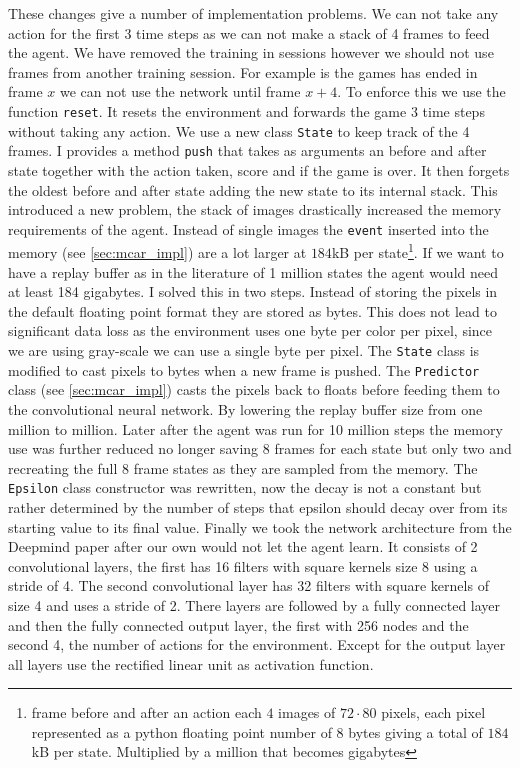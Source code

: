 These changes give a number of implementation problems. We can not take any action for the first 3 time steps as we can not make a stack of 4 frames to feed the agent. We have removed the training in sessions however we should not use frames from another training session. For example is the games has ended in frame $x$ we can not use the network until frame $x+4$. To enforce this we use the function \texttt{reset}. It resets the environment and forwards the game 3 time steps without taking any action. We use a new class \texttt{State} to keep track of the 4 frames. I provides a method \texttt{push} that takes as arguments an before and after state together with the action taken, score and if the game is over. It then forgets the oldest before and after state adding the new state to its internal stack.
%
This introduced a new problem, the stack of images drastically increased the memory requirements of the agent. Instead of single images the \texttt{event} inserted into the memory (see \autoref{sec:mcar_impl}) are a lot larger at $184$kB per state\footnote{frame before and after an action each $4$ images of $72\cdot80$ pixels, each pixel represented as a python floating point number of $8$ bytes giving a total of $184$kB per state. Multiplied by a million that becomes gigabytes}. If we want to have a replay buffer as in the literature\cite{DQN} of 1 million states the agent would need at least 184 gigabytes. I solved this in two steps. Instead of storing the pixels in the default floating point format they are stored as bytes. This does not lead to significant data loss as the environment uses one byte per color per pixel, since we are using gray-scale we can use a single byte per pixel. The \texttt{State} class is modified to cast pixels to bytes when a new frame is pushed. The \texttt{Predictor} class (see \autoref{sec:mcar_impl}) casts the pixels back to floats before feeding them to the convolutional neural network. By lowering the replay buffer size from one million to  million. Later after the agent was run for 10 million steps the memory use was further reduced no longer saving 8 frames for each state but only two and recreating the full 8 frame states as they are sampled from the memory.
%
The \texttt{Epsilon} class constructor was rewritten, now the decay is not a constant but rather determined by the number of steps that epsilon should decay over from its starting value to its final value.
%
Finally we took the network architecture from the Deepmind paper\cite{DQN} after our own would not let the agent learn. It consists of 2 convolutional layers, the first has 16 filters with square kernels size 8 using a stride of 4. The second convolutional layer has 32 filters with square kernels of size 4 and uses a stride of 2. There layers are followed by a fully connected layer and then the fully connected output layer, the first with 256 nodes and the second 4, the number of actions for the environment. Except for the output layer all layers use the rectified linear unit as activation function.